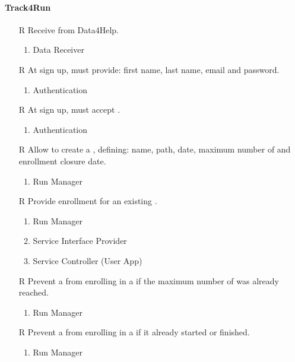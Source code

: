 \paragraph{Track4Run}
\begin{itemize}
	\item[R\subs{40}]Receive  from Data4Help.
	\begin{enumerate}
		\item Data Receiver
	\end{enumerate}
	\item[R\subs{41}]At sign up,  must provide: first name, last name, email and password.
	\begin{enumerate}
		\item Authentication
	\end{enumerate}
	\item[R\subs{42}]At sign up,  must accept .
	\begin{enumerate}
		\item Authentication
	\end{enumerate}
	\item[R\subs{43}]Allow  to create a , defining: name, path, date, maximum number of  and enrollment closure date.
	\begin{enumerate}
		\item Run Manager
	\end{enumerate}
	\item[R\subs{44}]Provide  enrollment for an existing .
	\begin{enumerate}
		\item Run Manager
		\item Service Interface Provider
		\item Service Controller (User App)
	\end{enumerate}
	\item[R\subs{45}]Prevent a  from enrolling in a  if the maximum number of  was already reached.
	\begin{enumerate}
		\item Run Manager
	\end{enumerate}
	\item[R\subs{46}]Prevent a  from enrolling in a  if it already started or finished.
	\begin{enumerate}
		\item Run Manager
	\end{enumerate}

\end{itemize}
